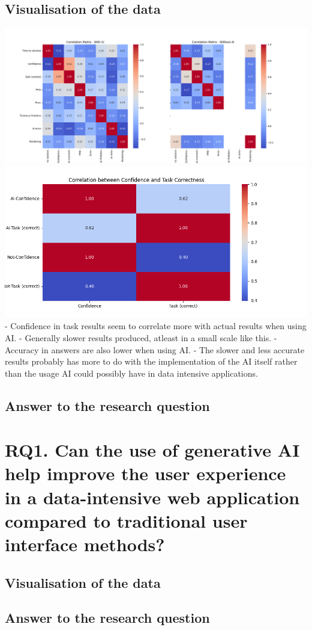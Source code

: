 \subsection{Visualisation of the data}
\includegraphics[width=\textwidth]{Images/correlation_matrix_split_treatment.png}
\includegraphics[width=\textwidth]{Images/confidence_correlation_heatmap.png}
 - Confidence in task results seem to correlate more with actual results when using AI.
 - Generally slower results produced, atleast in a small scale like this.
 - Accuracy in answers are also lower when using AI.
 - The slower and less accurate results probably has more to do with the implementation of the AI itself rather than the usage AI could possibly have in data intensive applications.
\subsection{Answer to the research question}

\section{RQ1. Can the use of generative AI help improve the user experience in a data-intensive web application compared to traditional user interface methods?}
\subsection{Visualisation of the data}
\subsection{Answer to the research question}
